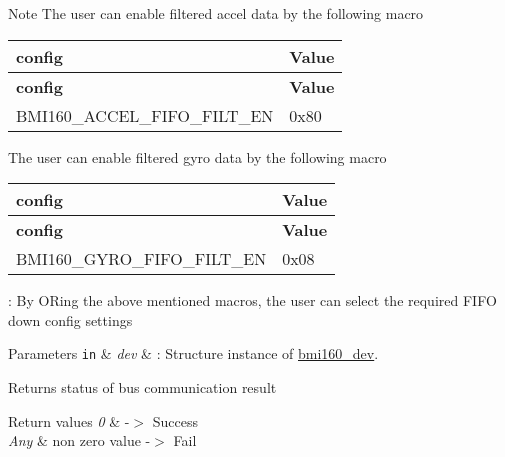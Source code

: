 \begin{DoxyNote}{Note}
The user can enable filtered accel data by the following macro \tabulinesep=1mm
\begin{longtabu} spread 0pt [c]{*{2}{|X[-1]}|}
\hline
\rowcolor{\tableheadbgcolor}\textbf{ config }&\textbf{ Value  }\\
\endfirsthead
\hline
\endfoot
\hline
\rowcolor{\tableheadbgcolor}\textbf{ config }&\textbf{ Value  }\\
\endhead
B\+M\+I160\+\_\+\+A\+C\+C\+E\+L\+\_\+\+F\+I\+F\+O\+\_\+\+F\+I\+L\+T\+\_\+\+EN &0x80 \\
\end{longtabu}


The user can enable filtered gyro data by the following macro \tabulinesep=1mm
\begin{longtabu} spread 0pt [c]{*{2}{|X[-1]}|}
\hline
\rowcolor{\tableheadbgcolor}\textbf{ config }&\textbf{ Value  }\\
\endfirsthead
\hline
\endfoot
\hline
\rowcolor{\tableheadbgcolor}\textbf{ config }&\textbf{ Value  }\\
\endhead
B\+M\+I160\+\_\+\+G\+Y\+R\+O\+\_\+\+F\+I\+F\+O\+\_\+\+F\+I\+L\+T\+\_\+\+EN &0x08 \\
\end{longtabu}


\+: By O\+Ring the above mentioned macros, the user can select the required F\+I\+FO down config settings
\end{DoxyNote}

\begin{DoxyParams}[1]{Parameters}
\mbox{\tt in}  & {\em dev} & \+: Structure instance of \hyperlink{structbmi160__dev}{bmi160\+\_\+dev}.\\
\hline
\end{DoxyParams}
\begin{DoxyReturn}{Returns}
status of bus communication result 
\end{DoxyReturn}

\begin{DoxyRetVals}{Return values}
{\em 0} & -\/$>$ Success \\
\hline
{\em Any} & non zero value -\/$>$ Fail \\
\hline
\end{DoxyRetVals}
\mbox{\label{group__bmi160_ga0b471abfa1d28d5797b5de9c9b457a53}} 
